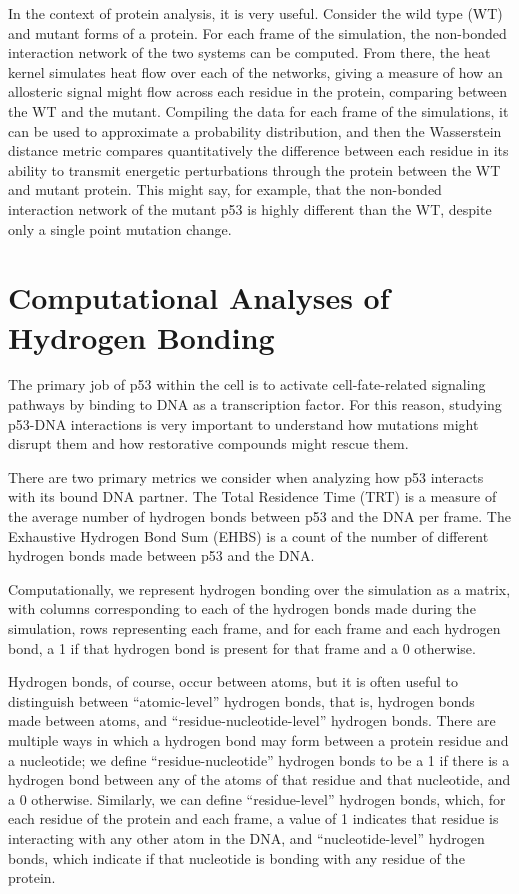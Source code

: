 In the context of protein analysis, it is very useful. Consider the wild type (WT) and mutant forms of a protein. For each frame of the simulation, the non-bonded interaction network of the two systems can be computed. From there, the heat kernel simulates heat flow over each of the networks, giving a measure of how an allosteric signal might flow across each residue in the protein, comparing between the WT and the mutant. Compiling the data for each frame of the simulations, it can be used to approximate a probability distribution, and then the Wasserstein distance metric compares quantitatively the difference between each residue in its ability to transmit energetic perturbations through the protein between the WT and mutant protein. This might say, for example, that the non-bonded interaction network of the mutant p53 is highly different than the WT, despite only a single point mutation change.

\section{Computational Analyses of Hydrogen Bonding}

The primary job of p53 within the cell is to activate cell-fate-related signaling pathways by binding to DNA as a transcription factor. For this reason, studying p53-DNA interactions is very important to understand how mutations might disrupt them and how restorative compounds might rescue them.

There are two primary metrics we consider when analyzing how p53 interacts with its bound DNA partner. The Total Residence Time (TRT) is a measure of the average number of hydrogen bonds between p53 and the DNA per frame. The Exhaustive Hydrogen Bond Sum (EHBS) is a count of the number of different hydrogen bonds made between p53 and the DNA.

Computationally, we represent hydrogen bonding over the simulation as a matrix, with columns corresponding to each of the hydrogen bonds made during the simulation, rows representing each frame, and for each frame and each hydrogen bond, a \num{1} if that hydrogen bond is present for that frame and a \num{0} otherwise.

Hydrogen bonds, of course, occur between atoms, but it is often useful to distinguish between ``atomic-level'' hydrogen bonds, that is, hydrogen bonds made between atoms, and ``residue-nucleotide-level'' hydrogen bonds. There are multiple ways in which a hydrogen bond may form between a protein residue and a nucleotide; we define ``residue-nucleotide'' hydrogen bonds to be a \num{1} if there is a hydrogen bond between any of the atoms of that residue and that nucleotide, and a \num{0} otherwise. Similarly, we can define ``residue-level'' hydrogen bonds, which, for each residue of the protein and each frame, a value of \num{1} indicates that residue is interacting with any other atom in the DNA, and ``nucleotide-level'' hydrogen bonds, which indicate if that nucleotide is bonding with any residue of the protein.

